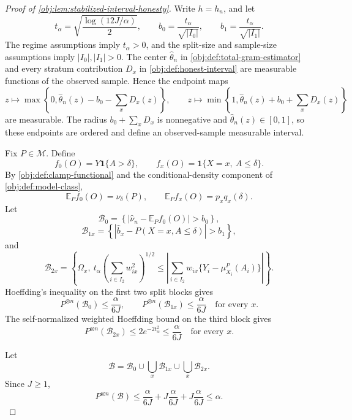\begin{proof}[Proof of \cref{obj:lem:stabilized-interval-honesty}]
Write \(h=h_n\), and let
\[
        t_\alpha=\sqrt{\frac{\log(12J/\alpha)}{2}},
        \qquad
        b_0=\frac{t_\alpha}{\sqrt{|I_0|}},
        \qquad
        b_1=\frac{t_\alpha}{\sqrt{|I_1|}} .
\]
The regime assumptions imply \(t_\alpha>0\), and the split-size and sample-size assumptions imply \(|I_0|,|I_1|>0\).  The center \(\widehat\theta_n\) in \cref{obj:def:total-gram-estimator} and every stratum contribution \(D_x\) in \cref{obj:def:honest-interval} are measurable functions of the observed sample.  Hence the endpoint maps
\[
        z\mapsto
        \max\!\left\{0,\widehat\theta_n(z)-b_0-\sum_xD_x(z)\right\},
        \qquad
        z\mapsto
        \min\!\left\{1,\widehat\theta_n(z)+b_0+\sum_xD_x(z)\right\}
\]
are measurable.  The radius \(b_0+\sum_xD_x\) is nonnegative and \(\widehat\theta_n(z)\in[0,1]\), so these endpoints are ordered and define an observed-sample measurable interval. %

Fix \(P\in\mathcal M\).  Define
\[
 f_0(O)=Y\mathbf 1\{A>\delta\},
 \qquad
 f_x(O)=\mathbf 1\{X=x,\ A\le\delta\}.
\]
By \cref{obj:def:clamp-functional} and the conditional-density component of \cref{obj:def:model-class},
\[
        \mathbb E_P f_0(O)=\nu_\delta(P),
        \qquad
        \mathbb E_P f_x(O)=p_xq_x(\delta).
\]
Let
\[
\mathcal B_0=
\left\{
\left|
\widehat\nu_n-\mathbb E_P f_0(O)
\right|>b_0
\right\},
\]
\[
\mathcal B_{1x}=
\left\{
\left|
\widehat b_x-P(X=x,A\le\delta)
\right|>b_1
\right\},
\]
and
\[
\mathcal B_{2x}=
\left\{
\Omega_x,
\ t_\alpha\left(\sum_{i\in I_2}w_{ix}^2\right)^{1/2}
\le
\left|
\sum_{i\in I_2}w_{ix}\{Y_i-\mu^P_{X_i}(A_i)\}
\right|
\right\}.
\]
Hoeffding's inequality on the first two split blocks gives
\[
        P^{\otimes n}(\mathcal B_0)
        \le \frac{\alpha}{6J},
        \qquad
        P^{\otimes n}(\mathcal B_{1x})
        \le \frac{\alpha}{6J}
        \quad\text{for every }x .
\]
The self-normalized weighted Hoeffding bound on the third block gives
\[
        P^{\otimes n}(\mathcal B_{2x})
        \le
        2e^{-2t_\alpha^2}
        \le
        \frac{\alpha}{6J}
        \quad\text{for every }x .
\]

Let
\[
        \mathcal B
        =
        \mathcal B_0\cup
        \bigcup_x\mathcal B_{1x}\cup
        \bigcup_x\mathcal B_{2x}.
\]
Since \(J\ge1\),
\[
        P^{\otimes n}(\mathcal B)
        \le
        \frac{\alpha}{6J}
        +J\frac{\alpha}{6J}
        +J\frac{\alpha}{6J}
        \le \alpha .
\]


\end{proof}

